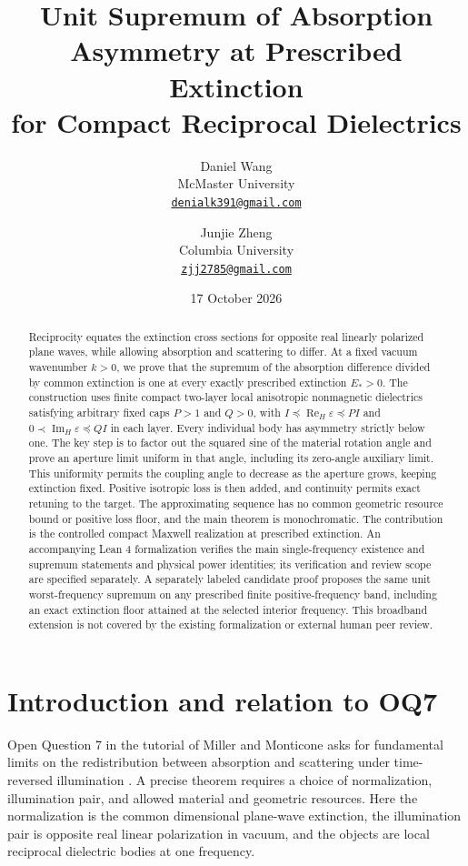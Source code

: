 \documentclass[11pt]{article}
\title{Unit Supremum of Absorption Asymmetry at Prescribed Extinction\\for Compact Reciprocal Dielectrics}
\author{Daniel Wang\\McMaster University\\\href{mailto:denialk391@gmail.com}{\texttt{denialk391@gmail.com}}
\and Junjie Zheng\\Columbia University\\\href{mailto:zjj2785@gmail.com}{\texttt{zjj2785@gmail.com}}}
\date{17 October 2026}
\newcommand{\ReH}{\operatorname{Re}_{\!H}}
\newcommand{\ImH}{\operatorname{Im}_{\!H}}
\begin{document}
\maketitle
\begin{abstract}
Reciprocity equates the extinction cross sections for opposite real linearly polarized plane waves, while allowing absorption and scattering to differ. At a fixed vacuum wavenumber $k>0$, we prove that the supremum of the absorption difference divided by common extinction is one at every exactly prescribed extinction $E_*>0$. The construction uses finite compact two-layer local anisotropic nonmagnetic dielectrics satisfying arbitrary fixed caps $P>1$ and $Q>0$, with $I\preceq\ReH\varepsilon\preceq PI$ and $0\prec\ImH\varepsilon\preceq QI$ in each layer. Every individual body has asymmetry strictly below one. The key step is to factor out the squared sine of the material rotation angle and prove an aperture limit uniform in that angle, including its zero-angle auxiliary limit. This uniformity permits the coupling angle to decrease as the aperture grows, keeping extinction fixed. Positive isotropic loss is then added, and continuity permits exact retuning to the target. The approximating sequence has no common geometric resource bound or positive loss floor, and the main theorem is monochromatic. The contribution is the controlled compact Maxwell realization at prescribed extinction. An accompanying Lean 4 formalization verifies the main single-frequency existence and supremum statements and physical power identities; its verification and review scope are specified separately. A separately labeled candidate proof proposes the same unit worst-frequency supremum on any prescribed finite positive-frequency band, including an exact extinction floor attained at the selected interior frequency. This broadband extension is not covered by the existing formalization or external human peer review.
\end{abstract}

\section{Introduction and relation to OQ7}\label{sec:intro}
Open Question 7 in the tutorial of Miller and Monticone asks for fundamental limits on the redistribution between absorption and scattering under time-reversed illumination \citep{MillerMonticone2026}. A precise theorem requires a choice of normalization, illumination pair, and allowed material and geometric resources. Here the normalization is the common dimensional plane-wave extinction, the illumination pair is opposite real linear polarization in vacuum, and the objects are local reciprocal dielectric bodies at one frequency.
\end{document}
